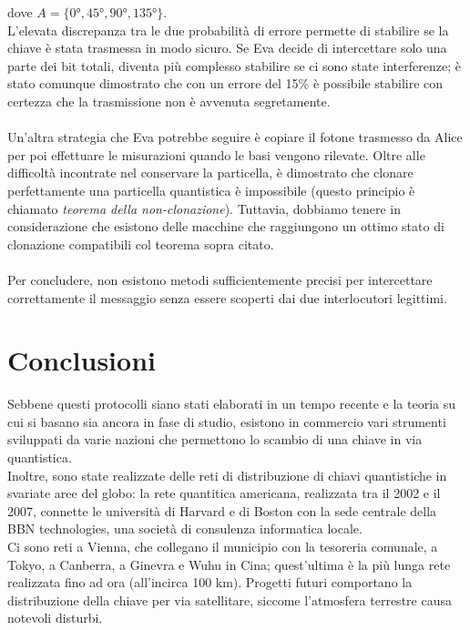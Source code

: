 \documentclass[italian,A4,12pt]{article}
\begin{document}
    dove $A=\{\ang{0},\ang{45},\ang{90},\ang{135}\}$.\\
    L'elevata discrepanza tra le due probabilità di errore permette di stabilire se la chiave è stata trasmessa in modo sicuro.
    Se Eva decide di intercettare solo una parte dei bit totali, diventa più complesso stabilire se ci sono state interferenze; è stato comunque dimostrato che con un errore del 15\% è possibile stabilire con certezza che la trasmissione non è avvenuta segretamente.\\\\
    Un'altra strategia che Eva potrebbe seguire è copiare il fotone trasmesso da Alice per poi effettuare le misurazioni quando le basi vengono rilevate. Oltre alle difficoltà incontrate nel conservare la particella, è dimostrato che clonare perfettamente una particella quantistica è impossibile (questo principio è chiamato \textit{teorema della non-clonazione}).
    Tuttavia, dobbiamo tenere in considerazione che esistono delle macchine che raggiungono un ottimo stato di clonazione compatibili col teorema sopra citato.\\\\
     Per concludere, non esistono metodi sufficientemente precisi per intercettare correttamente il messaggio senza essere scoperti dai due interlocutori legittimi.
  \section{Conclusioni}
     Sebbene questi protocolli siano stati elaborati in un tempo recente e la teoria su cui si basano sia ancora in fase di studio, esistono in commercio vari strumenti sviluppati da varie nazioni che permettono lo scambio di una chiave in via quantistica.\\
     Inoltre, sono state realizzate delle reti di distribuzione di chiavi quantistiche in svariate aree del globo: la rete quantitica americana, realizzata tra il 2002 e il 2007, connette le università di Harvard e di Boston con la sede centrale della BBN technologies, una società di consulenza informatica locale.\\
     Ci sono reti a Vienna, che collegano il municipio con la tesoreria comunale, a Tokyo, a Canberra, a Ginevra e Wuhu in Cina; quest'ultima è la più lunga rete realizzata fino ad ora (all'incirca 100 km). Progetti futuri comportano la distribuzione della chiave per via satellitare, siccome l'atmosfera terrestre causa notevoli disturbi.
     \newpage
\end{document}

